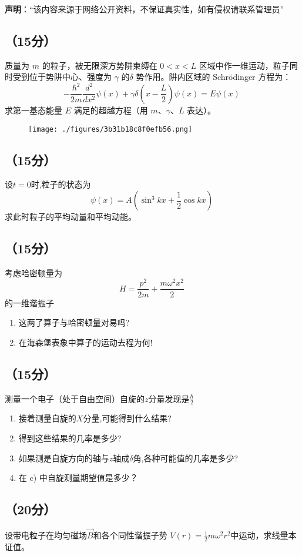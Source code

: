 
\textbf{声明}：“该内容来源于网络公开资料，不保证真实性，如有侵权请联系管理员”

\subsection{（15分）}
质量为 $m$ 的粒子，被无限深方势阱束缚在 $0 < x < L$ 区域中作一维运动，粒子同时受到位于势阱中心、强度为 $\gamma$ 的$\delta$ 势作用。阱内区域的 Schrödinger 方程为：
\[
-\frac{\hbar^2}{2m}\frac{d^2 }{dx^2}\psi(x) + \gamma \delta \left(x - \frac{L}{2}\right)\psi(x) = E \psi(x)~
\]
求第一基态能量 $E$ 满足的超越方程（用 $m$、$\gamma$、$L$ 表达）。
\begin{figure}[ht]
\centering
\texttt{[image: ./figures/3b31b18c8f0efb56.png]}
\caption{} \label{fig_SEU01_1}
\end{figure}

\subsection{（15分）}
设$t=0$时,粒子的状态为
 \[\psi(x) = A \left( \sin^3 kx + \frac{1}{2} \cos kx \right)~\]
求此时粒子的平均动量和平均动能。

\subsection{（15分）}
考虑哈密顿量为 
\[H = \frac{p^2}{2m} + \frac{m \omega^2 x^2}{2}~\]
的一维谐振子
\begin{enumerate}
    “初始位置”  和“初始动量” 的算子：
    \[
    x_0 = x \cos \omega t - \frac{p}{m \omega} \sin \omega t~
    \]
    \[
    p_0 = p \cos \omega t + m \omega x \sin \omega t~
    \]
    的期待值对时间的依赖关系。
    \item  这两了算子与哈密顿量对易吗?
    \item  在海森堡表象中算子的运动去程为何!
\end{enumerate}

\subsection{（15分）}测量一个电子（处于自由空间）自旋的$z$分量发现是$\frac{\hbar}{2}$
\begin{enumerate}
\item 接着测量自旋的$X$分量,可能得到什么结果?
\item 得到这些结果的几率是多少?
\item 如果测是自旋方向的轴与$z$轴成$\delta$角,各种可能值的几率是多少?
\item 在 c) 中自旋测量期望值是多少？
\end{enumerate}

\subsection{（20分）}
设带电粒子在均匀磁场$\vec{B}$和各个同性谐振子势 $V(r) = \frac{1}{2}m\omega^2 r^2$中运动，求线量本证值。
